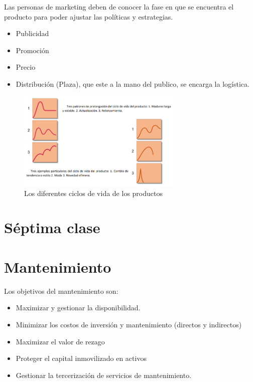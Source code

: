 \documentclass[titlepage,a4paper]{article}
\begin{document}
Las personas de marketing deben de conocer la fase en que se encuentra el producto para poder ajustar las políticas y estrategias.

\begin{itemize}
    \item Publicidad
    \item Promoción
    \item Precio
    \item Distribución (Plaza), que este a la mano del publico, se encarga la logística.
\end{itemize}

\begin{figure}[!htb]
    \centering
    \includegraphics[width=0.7\textwidth]{imagenes/TiposDeCiclosDeVida.PNG}
    \caption{Los diferentes ciclos de vida de los productos}
\end{figure}

\newpage

\section*{Séptima clase}
\section{Mantenimiento}
Los objetivos del mantenimiento son:
\begin{itemize}
    \item Maximizar y gestionar la disponibilidad.
    \item Minimizar los costos de inversión y mantenimiento (directos y indirectos)
    \item Maximizar el valor de rezago
    \item Proteger el capital inmovilizado en activos
    \item Gestionar la tercerización de servicios de mantenimiento.
\end{itemize}
\end{document}
